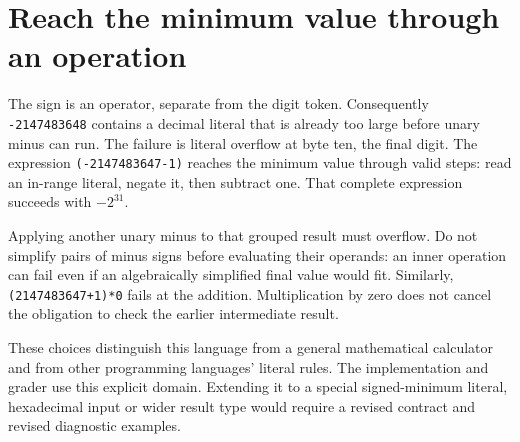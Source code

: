 \section{Reach the minimum value through an operation}\label{expression-minimum}
The sign is an operator, separate from the digit token. Consequently
\texttt{-2147483648} contains a decimal literal that is already too large before
unary minus can run. The failure is literal overflow at byte ten, the final digit.
The expression \texttt{(-2147483647-1)} reaches the minimum value through valid
steps: read an in-range literal, negate it, then subtract one. That complete expression
succeeds with $-2^{31}$.

Applying another unary minus to that grouped result must overflow. Do not simplify
pairs of minus signs before evaluating their operands: an inner operation can fail
even if an algebraically simplified final value would fit. Similarly,
\texttt{(2147483647+1)*0} fails at the addition. Multiplication by zero does not
cancel the obligation to check the earlier intermediate result.

These choices distinguish this language from a general mathematical calculator and
from other programming languages' literal rules. The implementation and grader use
this explicit domain. Extending it to a special signed-minimum literal, hexadecimal
input or wider result type would require a revised contract and revised diagnostic
examples.
